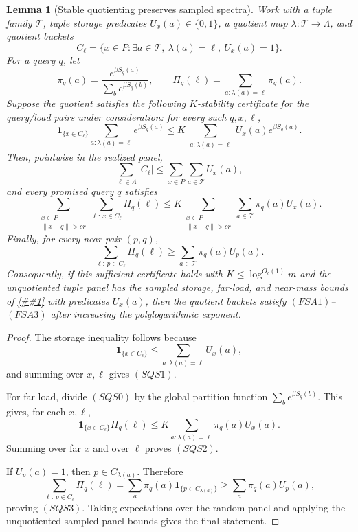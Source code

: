\documentclass[10pt]{article}
\newcommand{\cref}[1]{\ref{##1}}
\newtheorem{lemma}[theorem]{Lemma}
\theoremstyle{definition}
\begin{document}
\begin{lemma}[Stable quotienting preserves sampled spectra]
   \label{lem:stable-quotient-sampled-spectrum}
   Work with a tuple family \(\mathcal T\), tuple storage predicates
   \(U_x(a)\in\{0,1\}\), a quotient map
   \(\lambda:\mathcal T\to\Lambda\), and quotient buckets
   \[
      C_\ell=\{x\in P:\exists a\in\mathcal T,\ \lambda(a)=\ell,\ U_x(a)=1\}.
   \]
   For a query \(q\), let
   \[
      \pi_q(a)=\frac{e^{\beta S_q(a)}}{\sum_b e^{\beta S_q(b)}},
      \qquad
      \Pi_q(\ell)=\sum_{a:\lambda(a)=\ell}\pi_q(a).
   \]
   Suppose the quotient satisfies the following \(K\)-stability certificate for
   the query/load pairs under consideration: for every such \(q,x,\ell\),
   \[
      \mathbf 1_{\{x\in C_\ell\}}
      \sum_{a:\lambda(a)=\ell}e^{\beta S_q(a)}
      \le
      K\sum_{\substack{a:\lambda(a)=\ell}}U_x(a)e^{\beta S_q(a)}.
      \tag{SQS0}
   \]
   Then, pointwise in the realized panel,
   \[
      \sum_{\ell\in\Lambda}|C_\ell|
      \le
      \sum_{x\in P}\sum_{a\in\mathcal T}U_x(a),
      \tag{SQS1}
   \]
   and every promised query \(q\) satisfies
   \[
      \sum_{\substack{x\in P\\ \|x-q\|>cr}}
      \sum_{\ell:\,x\in C_\ell}\Pi_q(\ell)
      \le
      K
      \sum_{\substack{x\in P\\ \|x-q\|>cr}}
      \sum_{a\in\mathcal T}\pi_q(a)U_x(a).
      \tag{SQS2}
   \]
   Finally, for every near pair \((p,q)\),
   \[
      \sum_{\ell:\,p\in C_\ell}\Pi_q(\ell)
      \ge
      \sum_{a\in\mathcal T}\pi_q(a)U_p(a).
      \tag{SQS3}
   \]
   Consequently, if this sufficient certificate holds with
   \(K\le\log^{O_c(1)}m\) and the unquotiented tuple panel has
   the sampled storage, far-load, and near-mass bounds of
   \cref{prop:sampled-structured-panel} with predicates \(U_x(a)\), then the
   quotient buckets satisfy \((FSA1)\)--\((FSA3)\) after increasing the
   polylogarithmic exponent.
\end{lemma}

\begin{proof}
   The storage inequality follows because
   \[
      \mathbf 1_{\{x\in C_\ell\}}
      \le
      \sum_{a:\lambda(a)=\ell}U_x(a),
   \]
   and summing over \(x,\ell\) gives \((SQS1)\).

   For far load, divide \((SQS0)\) by the global partition function
   \(\sum_b e^{\beta S_q(b)}\).  This gives, for each \(x,\ell\),
   \[
      \mathbf 1_{\{x\in C_\ell\}}\Pi_q(\ell)
      \le
      K\sum_{a:\lambda(a)=\ell}\pi_q(a)U_x(a).
   \]
   Summing over far \(x\) and over \(\ell\) proves \((SQS2)\).

   If \(U_p(a)=1\), then \(p\in C_{\lambda(a)}\).  Therefore
   \[
      \sum_{\ell:\,p\in C_\ell}\Pi_q(\ell)
      =
      \sum_a\pi_q(a)\mathbf 1_{\{p\in C_{\lambda(a)}\}}
      \ge
      \sum_a\pi_q(a)U_p(a),
   \]
   proving \((SQS3)\).  Taking expectations over the random panel and applying
   the unquotiented sampled-panel bounds gives the final statement.
\end{proof}
\end{document}
